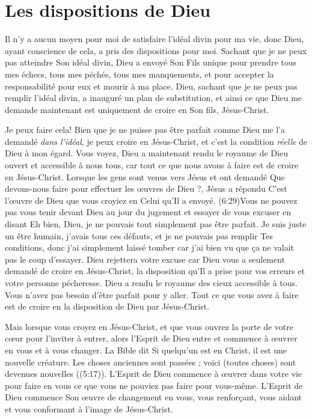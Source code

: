 \section{Les dispositions de Dieu}

Il n'y a aucun moyen pour moi de satisfaire l'idéal divin
 pour ma vie, donc Dieu, ayant conscience de cela, a pris
 des dispositions pour moi.
 Sachant que je ne peux pas atteindre Son idéal divin,
 Dieu a envoyé Son Fils unique pour prendre tous mes échecs,
 tous mes péchés, tous mes manquements, et pour accepter la responsabilité
 pour eux et mourir à ma place.
 Dieu, sachant que je ne peux pas remplir l'idéal divin,
 a inauguré un plan de substitution, et ainsi ce que Dieu
 me demande maintenant est uniquement de croire en Son fils, Jésus-Christ.

Je peux faire cela!
 Bien que je ne puisse pas être parfait
 comme Dieu me l'a demandé \emph{dans l'idéal},
 je peux croire en Jésus-Christ,
 et c'est la condition \emph{réelle} de Dieu à mon égard.
 Vous voyez, Dieu a maintenant rendu le royaume de Dieu ouvert
 et accessible à nous tous, car tout ce que nous avons à faire
 est de croire en Jésus-Christ.
 Lorsque les gens sont venus vers Jésus et ont demandé\frcolon{}
 \Og Que devons-nous faire pour effectuer les œuvres de Dieu ?\Fg{},
 Jésus a répondu\frcolon{}
 \Og C'est l'œuvre de Dieu que vous croyiez en Celui qu'Il a envoyé. \Fg{}
 (6:29)Vous ne pouvez pas vous tenir devant Dieu au jour du jugement
 et essayer de vous excuser en disant\frcolon{}
 \Og Eh bien, Dieu, je ne pouvais tout simplement pas être parfait.
 Je suis juste un être humain, j'avais tous ces défauts,
 et je ne pouvais pas remplir Tes conditions,
 donc j'ai simplement laissé tomber car j'ai bien vu
 que ça ne valait pas le coup d'essayer. \Fg{}
 Dieu rejettera votre excuse car Dieu vous a seulement demandé
 de croire en Jésus-Christ, la disposition qu'Il a prise pour vos erreurs
 et votre personne pécheresse.
 Dieu a rendu le royaume des cieux accessible à tous.
 Vous n'avez pas besoin d'être parfait pour y aller.
 Tout ce que vous avez à faire est de croire en la disposition
 de Dieu par Jésus-Christ.

Mais lorsque vous croyez en Jésus-Christ,
 et que vous ouvrez la porte de votre cœur
 pour l'inviter à entrer,
 alors l'Esprit de Dieu entre et commence à œuvrer en vous
 et à vous changer.
 La Bible dit\frcolon{}
 \Og Si quelqu'un est en Christ, il est une nouvelle créature.
 Les choses anciennes sont passées ; voici\frcolon{} (toutes choses)
 sont devenues nouvelles \Fg{} ((5:17)).
 L'Esprit de Dieu commence à œuvrer dans votre vie pour faire
 en vous ce que vous ne pouviez pas faire pour vous-même.
 L'Esprit de Dieu commence Son œuvre de changement en vous,
 vous renforçant, vous aidant et vous conformant à l'image de Jésus-Christ.


